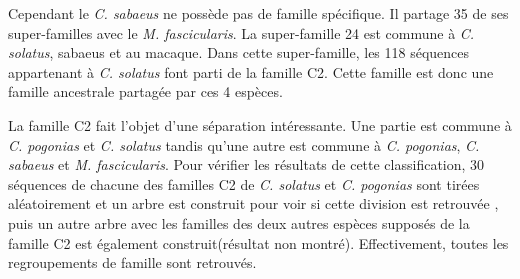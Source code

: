 \documentclass[12pt,a4paper]{article}
\begin{document}
				Cependant le \textit{C. sabaeus} ne possède pas de famille spécifique. Il partage 35 de ses super-familles avec le \textit{M. fascicularis}. La super-famille 24 est commune à \textit{C. solatus}, sabaeus et au macaque. Dans cette super-famille, les 118 séquences appartenant à \textit{C. solatus} font parti de la famille C2. Cette famille est donc une famille ancestrale partagée par ces 4 espèces. 
				
				La famille C2 fait l'objet d'une séparation intéressante. Une partie est commune à \textit{C. pogonias} et \textit{C. solatus} tandis qu'une autre est commune à \textit{C. pogonias}, \textit{C. sabaeus} et \textit{M. fascicularis}. Pour vérifier les résultats de cette classification, 30 séquences de chacune des familles C2 de \textit{C. solatus} et \textit{C. pogonias} sont tirées aléatoirement et un arbre est construit pour voir si cette division est retrouvée , puis un autre arbre avec les familles des deux autres espèces supposés de la famille C2 est également construit(résultat non montré). Effectivement, toutes les regroupements de famille sont retrouvés.
							
\end{document}
